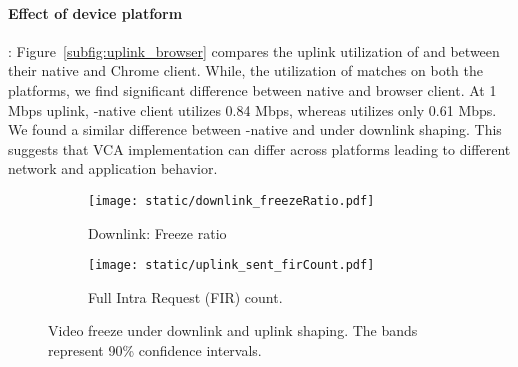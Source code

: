 \paragraph{Effect of device platform}: Figure~\ref{subfig:uplink_browser} compares the uplink utilization of \zoom and \teams between their native and Chrome client. While, the utilization of \zoom matches on both the platforms, we find significant difference between \teams native and browser client. At 1 Mbps uplink, \teams-native client utilizes 0.84 Mbps, whereas \teamsbrowser utilizes only 0.61 Mbps. We found a similar difference between \teams-native and \teamsbrowser under downlink shaping. This suggests that VCA implementation can differ across platforms leading to different network and application behavior. 


\begin{figure}[t]
    \centering
    \begin{subfigure}[t]{0.4\textwidth}      
        \texttt{[image: static/downlink\_freezeRatio.pdf]}
        \caption{Downlink: Freeze ratio}
 		\label{subfig:downlink_freeze_ratio}
    \end{subfigure}
	\begin{subfigure}[t]{0.4\textwidth}   
        \centering
        \texttt{[image: static/uplink\_sent\_firCount.pdf]}
    \caption{Full Intra Request (FIR) count.}
    \label{subfig:uplink_fir}
    \end{subfigure}%
	\caption{Video freeze under downlink and uplink shaping. The bands represent 90\% confidence intervals.%
	}
	\label{fig:video_freeze}
\end{figure}







